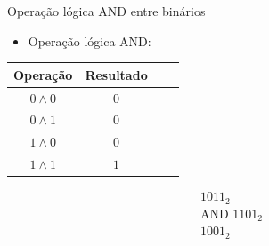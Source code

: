 
\begin{frame}{Operação lógica AND entre binários}
    \begin{itemize}
        \item Operação lógica AND:
    \end{itemize}
    \begin{table}[h]
        \centering
        \begin{tabular}{c|c|c|c}
            \hline
            \textbf{Operação} & \textbf{Resultado} \\
            \hline
            $0 \land 0$         & $0$ \\
            $0 \land 1$         & $0$ \\
            $1 \land 0$         & $0$ \\
            $1 \land 1$         & $1$ \\
            \hline
        \end{tabular}
    \end{table}

    \[ \begin{array}{r} 1011_{2} \\ \text{AND }1101_{2} \\ \hline 1001_{2} \end{array} \]
\end{frame}